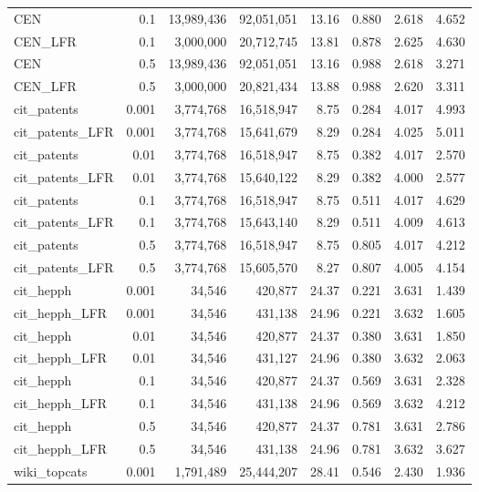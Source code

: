 \documentclass[a4paper]{article}   	%
\begin{document}
\begin{table}[h!]
\begin{tabular}{lrrrrrrr}
CEN      & 0.1   & 13,989,436 & 92,051,051 & 13.16    & 0.880 & 2.618 & 4.652 \\
CEN\_LFR & 0.1   & 3,000,000  & 20,712,745 & 13.81    & 0.878 & 2.625 & 4.630 \\ \hline
CEN      & 0.5   & 13,989,436 & 92,051,051 & 13.16    & 0.988 & 2.618 & 3.271 \\
CEN\_LFR & 0.5   & 3,000,000  & 20,821,434 & 13.88    & 0.988 & 2.620 & 3.311 \\ \hline \hline
cit\_patents      & 0.001 & 3,774,768 & 16,518,947 & 8.75     & 0.284 & 4.017 & 4.993 \\
cit\_patents\_LFR & 0.001 & 3,774,768 & 15,641,679 & 8.29     & 0.284 & 4.025 & 5.011 \\ \hline
cit\_patents      & 0.01  & 3,774,768 & 16,518,947 & 8.75     & 0.382 & 4.017 & 2.570 \\
cit\_patents\_LFR & 0.01  & 3,774,768 & 15,640,122 & 8.29     & 0.382 & 4.000 & 2.577 \\ \hline
cit\_patents      & 0.1   & 3,774,768 & 16,518,947 & 8.75     & 0.511 & 4.017 & 4.629 \\
cit\_patents\_LFR & 0.1   & 3,774,768 & 15,643,140 & 8.29     & 0.511 & 4.009 & 4.613 \\ \hline
cit\_patents      & 0.5   & 3,774,768 & 16,518,947 & 8.75     & 0.805 & 4.017 & 4.212 \\
cit\_patents\_LFR & 0.5   & 3,774,768 & 15,605,570 & 8.27     & 0.807 & 4.005 & 4.154 \\ \hline \hline
cit\_hepph      & 0.001 & 34,546 & 420,877 & 24.37    & 0.221 & 3.631 & 1.439 \\
cit\_hepph\_LFR & 0.001 & 34,546 & 431,138 & 24.96    & 0.221 & 3.632 & 1.605 \\ \hline
cit\_hepph      & 0.01  & 34,546 & 420,877 & 24.37    & 0.380 & 3.631 & 1.850 \\
cit\_hepph\_LFR & 0.01  & 34,546 & 431,127 & 24.96    & 0.380 & 3.632 & 2.063 \\ \hline
cit\_hepph      & 0.1   & 34,546 & 420,877 & 24.37    & 0.569 & 3.631 & 2.328 \\
cit\_hepph\_LFR & 0.1   & 34,546 & 431,138 & 24.96    & 0.569 & 3.632 & 4.212 \\ \hline
cit\_hepph      & 0.5   & 34,546 & 420,877 & 24.37    & 0.781 & 3.631 & 2.786 \\
cit\_hepph\_LFR & 0.5   & 34,546 & 431,138 & 24.96    & 0.781 & 3.632 & 3.627 \\ \hline \hline
wiki\_topcats      & 0.001 & 1,791,489 & 25,444,207 & 28.41    & 0.546 & 2.430 & 1.936 \\

\end{tabular}
\end{table}
\end{document}

